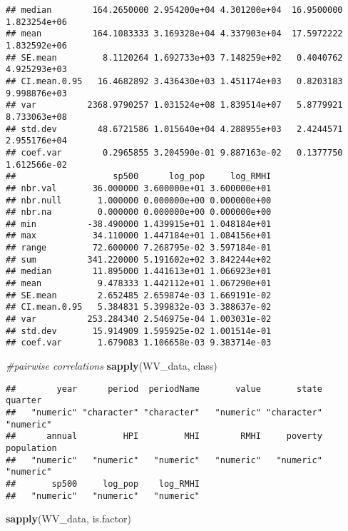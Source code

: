 \documentclass[
]{article}
\newenvironment{Shaded}{\begin{snugshade}}{\end{snugshade}}
\newcommand{\CommentTok}[1]{\textcolor[rgb]{0.56,0.35,0.01}{\textit{#1}}}
\newcommand{\KeywordTok}[1]{\textcolor[rgb]{0.13,0.29,0.53}{\textbf{#1}}}
\newcommand{\NormalTok}[1]{#1}
\begin{document}
\begin{verbatim}
## median        164.2650000 2.954200e+04 4.301200e+04  16.9500000 1.823254e+06
## mean          164.1083333 3.169328e+04 4.337903e+04  17.5972222 1.832592e+06
## SE.mean         8.1120264 1.692733e+03 7.148259e+02   0.4040762 4.925293e+03
## CI.mean.0.95   16.4682892 3.436430e+03 1.451174e+03   0.8203183 9.998876e+03
## var          2368.9790257 1.031524e+08 1.839514e+07   5.8779921 8.733063e+08
## std.dev        48.6721586 1.015640e+04 4.288955e+03   2.4244571 2.955176e+04
## coef.var        0.2965855 3.204590e-01 9.887163e-02   0.1377750 1.612566e-02
##                   sp500      log_pop     log_RMHI
## nbr.val       36.000000 3.600000e+01 3.600000e+01
## nbr.null       1.000000 0.000000e+00 0.000000e+00
## nbr.na         0.000000 0.000000e+00 0.000000e+00
## min          -38.490000 1.439915e+01 1.048184e+01
## max           34.110000 1.447184e+01 1.084156e+01
## range         72.600000 7.268795e-02 3.597184e-01
## sum          341.220000 5.191602e+02 3.842244e+02
## median        11.895000 1.441613e+01 1.066923e+01
## mean           9.478333 1.442112e+01 1.067290e+01
## SE.mean        2.652485 2.659874e-03 1.669191e-02
## CI.mean.0.95   5.384831 5.399832e-03 3.388637e-02
## var          253.284340 2.546975e-04 1.003031e-02
## std.dev       15.914909 1.595925e-02 1.001514e-01
## coef.var       1.679083 1.106658e-03 9.383714e-03
\end{verbatim}

\begin{Shaded}
\begin{Highlighting}[]
\CommentTok{#pairwise correlations}
\KeywordTok{sapply}\NormalTok{(WV_data, class)}
\end{Highlighting}
\end{Shaded}

\begin{verbatim}
##        year      period  periodName       value       state     quarter 
##   "numeric" "character" "character"   "numeric" "character"   "numeric" 
##      annual         HPI         MHI        RMHI     poverty  population 
##   "numeric"   "numeric"   "numeric"   "numeric"   "numeric"   "numeric" 
##       sp500     log_pop    log_RMHI 
##   "numeric"   "numeric"   "numeric"
\end{verbatim}

\begin{Shaded}
\begin{Highlighting}[]
\KeywordTok{sapply}\NormalTok{(WV_data, is.factor)}
\end{Highlighting}
\end{Shaded}
\end{document}
